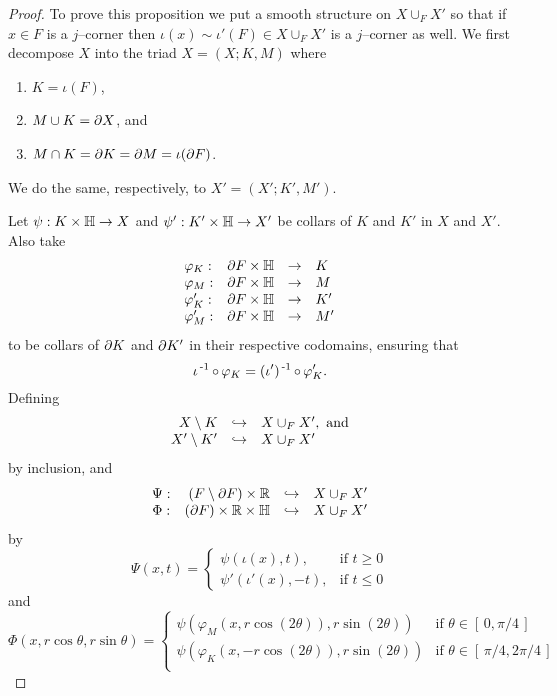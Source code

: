 \begin{proof}
	To prove this proposition we put a smooth structure on $X\cup_F X'$ so that if $x\in F$ is a $j$--corner then $\iota(x)\sim \iota'(F)\in X\cup_F X'$ is a $j$--corner as well.
	We first decompose $X$ into the triad $X=(X;K,M)$ where
	\begin{enumerate}
		\item $K=\iota(F)$,
		\item $M\cup K=\partial X$, and
		\item $M\cap K=\partial K = \partial M =\iota(\partial F)$.
	\end{enumerate}
	We do the same, respectively, to $X'=(X';K',M')$.
	
	Let $\psi:K\times\mathbb{H}\to X$ and $\psi':K'\times\mathbb{H} \to X'$ be collars of $K$ and $K'$ in $X$ and $X'$.
	Also take
	\[
		\begin{array}{lrcl}
			\varphi_K:&
			\partial F\times\mathbb{H}&
			\to&
			K\\
			\varphi_M:&
			\partial F\times\mathbb{H}&
			\to&
			M\\
			\varphi_K':&
			\partial F\times\mathbb{H}&
			\to&
			K'\\
			\varphi_M':&
			\partial F\times\mathbb{H}&
			\to&
			M'\\		
		\end{array}
	\]
	to be collars of $\partial K$ and $\partial K'$ in their respective codomains, ensuring that 
	\[
		\iota\inv\comp \varphi_K = (\iota')\inv\comp \varphi_K'.
	\]
	Defining
	\[
		\begin{array}{rcl}
			X\setminus K	&	\hookrightarrow	& 	X\cup_F X', \textrm{ and}	\\
			X'\setminus K'	&	\hookrightarrow	&	X\cup_F X'		
		\end{array}
	\]
	by inclusion, and
	\[
		\begin{array}{crcl}
			\Psi:&(F\setminus\partial F)\times\mathbb{R}&\hookrightarrow&X\cup_F X'\\
			\Phi:&(\partial F)\times\mathbb{R}\times\mathbb{H}&\hookrightarrow&X\cup_F X'		
		\end{array}
	\]
	by
	\[
		\Psi(x,t)=
		\begin{cases}
			\psi(\iota(x),t),		& 	\mbox{if } t\geq 0 \\
			\psi'(\iota'(x),-t),	&	\mbox{if } t\leq 0
		\end{cases}	
	\]
	and
	\[
		\Phi(x,r\cos\theta,r\sin\theta)=
		\begin{cases}
			\psi(\varphi_M(x,r\cos(2\theta)),r\sin(2\theta))
				&	\mbox{if } \theta\in[\,0,\pi/4\,]		\\
			\psi(\varphi_K(x,-r\cos(2\theta)),r\sin(2\theta))
				&	\mbox{if } \theta\in[\,\pi/4,2\pi/4\,]	\\

\end{cases}\]
\end{proof}
